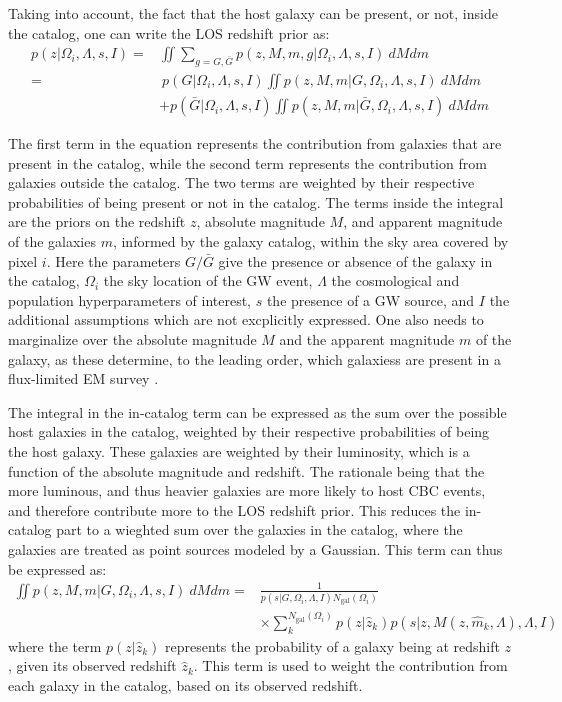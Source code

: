 Taking into account, the fact that the host galaxy can be present, or not, inside the catalog, one can write the \ac{LOS} redshift prior as:
\begin{align}
  p(z|\Omega_i, \Lambda, s, I) =& \iint \sum_{g=G,\bar{G}} p(z, M, m,g|\Omega_i, \Lambda, s, I)~dM dm \\
  =&~p(G|\Omega_i, \Lambda, s, I) \iint p(z, M, m|G,\Omega_i, \Lambda, s, I)~dM dm \nonumber \\
  &+ p(\bar{G}|\Omega_i, \Lambda, s, I) \iint p(z, M, m|\bar{G},\Omega_i, \Lambda, s, I)~dM dm
\end{align}

The first term in the equation represents the contribution from galaxies that are present in the catalog, while the second term represents the contribution from galaxies outside the catalog. The two terms are weighted by their respective probabilities of being present or not in the catalog. The terms inside the integral are the priors on the redshift $z$, absolute magnitude $M$, and apparent magnitude of the galaxies $m$, informed by the galaxy catalog, within the sky area covered by pixel $i$. Here the parameters $G/\bar{G}$ give the presence or absence of the galaxy in the catalog, $\Omega_i$ the sky location of the \ac{GW} event, $\Lambda$ the cosmological and population hyperparameters of interest, $s$ the presence of a \ac{GW} source, and $I$ the additional assumptions which are not excplicitly expressed. One also needs to marginalize over the absolute magnitude $M$ and the apparent magnitude $m$ of the galaxy, as these determine, to the leading order, which galaxiess are present in a flux-limited \ac{EM} survey \citep{gray2023joint}.

The integral in the in-catalog term can be expressed as the sum over the possible host galaxies in the catalog, weighted by their respective probabilities of being the host galaxy. These galaxies are weighted by their luminosity, which is a function of the absolute magnitude and redshift. The rationale being that the more luminous, and thus heavier galaxies are more likely to host \ac{CBC} events, and therefore contribute more to the \ac{LOS} redshift prior. This reduces the in-catalog part to a wieghted sum over the galaxies in the catalog, where the galaxies are treated as point sources modeled by a Gaussian. This term can thus be expressed as:
\begin{align}
  \iint p(z, M, m|G,\Omega_i, \Lambda, s, I)~dM dm =& \frac{1}{p(s|G,\Omega_i, \Lambda, I)N_{\mathrm{gal}}(\Omega_i)} \nonumber\\ 
  &\times \sum_{k}^{N_{\mathrm{gal}}(\Omega_i)} p(z|\hat{z}_k) p(s|z, M(z, \hat{m}_k, \Lambda), \Lambda, I)
\end{align}
where the term $p(z|\hat{z}_k)$ represents the probability of a galaxy being at redshift $z$, given its observed redshift $\hat{z}_k$. This term is used to weight the contribution from each galaxy in the catalog, based on its observed redshift.

